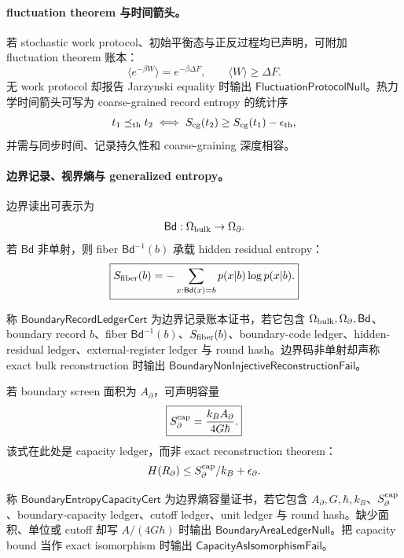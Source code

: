 \paragraph{fluctuation theorem 与时间箭头。}
若 stochastic work protocol、初始平衡态与正反过程均已声明，可附加 fluctuation theorem 账本：
\[
\langle e^{-\beta W}\rangle=e^{-\beta\Delta F},
\qquad
\langle W\rangle\ge\Delta F.
\]
无 work protocol 却报告 Jarzynski equality 时输出 \(\mathsf{FluctuationProtocolNull}\)。热力学时间箭头可写为 coarse-grained record entropy 的统计序
\[
t_1\preceq_{\rm th}t_2
\iff
S_{\rm cg}(t_2)\ge S_{\rm cg}(t_1)-\epsilon_{\rm th},
\]
并需与同步时间、记录持久性和 coarse-graining 深度相容。

\paragraph{边界记录、视界熵与 generalized entropy。}
边界读出可表示为
\[
\mathsf{Bd}:\Omega_{\rm bulk}\to\Omega_\partial.
\]
若 \(\mathsf{Bd}\) 非单射，则 fiber \(\mathsf{Bd}^{-1}(b)\) 承载 hidden residual entropy：
\[
\boxed{
S_{\rm fiber}(b)
=
-\sum_{x:\mathsf{Bd}(x)=b}p(x|b)\log p(x|b).
}
\]

\begin{definition}[边界记录账本证书]\label{def:typed-address-biaxial-completion-boundary-record-ledger-cert}
称 \(\mathsf{BoundaryRecordLedgerCert}\) 为边界记录账本证书，若它包含 \(\Omega_{\rm bulk},\Omega_\partial,\mathsf{Bd}\)、boundary record \(b\)、fiber \(\mathsf{Bd}^{-1}(b)\)、\(S_{\rm fiber}(b)\)、boundary-code ledger、hidden-residual ledger、external-register ledger 与 round hash。边界码非单射却声称 exact bulk reconstruction 时输出 \(\mathsf{BoundaryNonInjectiveReconstructionFail}\)。
\end{definition}

若 boundary screen 面积为 \(A_\partial\)，可声明容量
\[
\boxed{
S_\partial^{\rm cap}
=
\frac{k_BA_\partial}{4G\hbar}.
}
\]
该式在此处是 capacity ledger，而非 exact reconstruction theorem：
\[
H(R_\partial)\le S_\partial^{\rm cap}/k_B+\epsilon_\partial.
\]

\begin{definition}[边界熵容量证书]\label{def:typed-address-biaxial-completion-boundary-entropy-capacity-cert}
称 \(\mathsf{BoundaryEntropyCapacityCert}\) 为边界熵容量证书，若它包含 \(A_\partial,G,\hbar,k_B\)、\(S_\partial^{\rm cap}\)、boundary-capacity ledger、cutoff ledger、unit ledger 与 round hash。缺少面积、单位或 cutoff 却写 \(A/(4G\hbar)\) 时输出 \(\mathsf{BoundaryAreaLedgerNull}\)。把 capacity bound 当作 exact isomorphism 时输出 \(\mathsf{CapacityAsIsomorphismFail}\)。
\end{definition}

